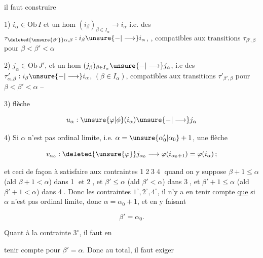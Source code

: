
il faut construire

1) $i_\alpha\in\mathrm{Ob}\,I$ et un hom $(i_\beta)_{\beta\in I_\alpha}\longrightarrow i_\alpha$ i.e. des $\tau_{\deleted{\unsure{\beta'}}\alpha,\beta}:i_\beta\unsure{-|\longrightarrow}i_\alpha$, , compatibles aux transitions $\tau_{\beta',\beta}$ pour $\beta<\beta'<\alpha$

2) $j_\alpha\in\mathrm{Ob}\,J'$, et un hom $(j_\beta)_{\beta\in I_\alpha}\unsure{-|\longrightarrow}j_\alpha$, i.e des $\tau'_{\alpha,\beta}:i_\beta\unsure{-|\longrightarrow}i_\alpha$, $(\beta\in I_\alpha)$, compatibles aux transitions $\tau'_{\beta',\beta}$ pour $\beta<\beta'<\alpha$ --

3)  flèche

\[
u_\alpha:\unsure{\varphi|\phi}(i_\alpha)\unsure{-|\longrightarrow}j_\alpha
\]

4) Si $\alpha$ n'est pas ordinal limite, i.e. $\alpha=\unsure{\alpha'_0|\alpha_0}+1$, une flèche

\[
v_{\alpha_0}:\deleted{\unsure{\varphi}}j_{\alpha_0}\longrightarrow\varphi(i_{\alpha_0+1})=\varphi(i_\alpha)\,;
\]

 et ceci de façon à satisfaire aux contraintes \textcircled{1}\textcircled{2}\textcircled{3}\textcircled{4} quand on y suppose $\beta+1\leq\alpha$ (ald $\beta+1<\alpha$) dans \textcircled{1} et \textcircled{2}, et $\beta'\leq\alpha$ (ald $\beta'<\alpha$) dans \textcircled{3}, et $\beta'+1\leq\alpha$ (ald $\beta'+1<\alpha$) dans \textcircled{4}. Donc  les contraintes $1^\circ,2^\circ,4^\circ$,  il n'y a en tenir compte \uline{que} si $\alpha$ n'est pas ordinal limite, donc $\alpha=\alpha_0+1$, et en y faisant

\[
\beta'=\alpha_0.
\]

Quant à la contrainte $3^\circ$, il faut en


tenir compte pour $\beta'=\alpha$. Donc au total, il faut exiger


